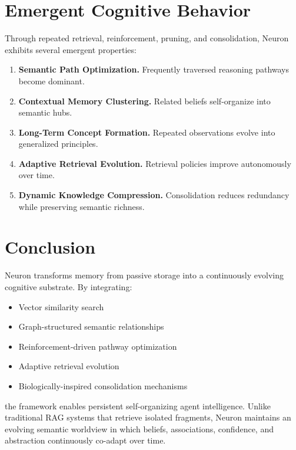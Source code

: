 \documentclass[11pt,a4paper]{article}
\begin{document}
\section{Emergent Cognitive Behavior}

Through repeated retrieval, reinforcement, pruning, and consolidation, Neuron exhibits
several emergent properties:

\begin{enumerate}
    \item \textbf{Semantic Path Optimization.}
          Frequently traversed reasoning pathways become dominant.

    \item \textbf{Contextual Memory Clustering.}
          Related beliefs self-organize into semantic hubs.

    \item \textbf{Long-Term Concept Formation.}
          Repeated observations evolve into generalized principles.

    \item \textbf{Adaptive Retrieval Evolution.}
          Retrieval policies improve autonomously over time.

    \item \textbf{Dynamic Knowledge Compression.}
          Consolidation reduces redundancy while preserving semantic richness.
\end{enumerate}

\section{Conclusion}

Neuron transforms memory from passive storage into a continuously evolving cognitive
substrate. By integrating:

\begin{itemize}
    \item Vector similarity search
    \item Graph-structured semantic relationships
    \item Reinforcement-driven pathway optimization
    \item Adaptive retrieval evolution
    \item Biologically-inspired consolidation mechanisms
\end{itemize}

the framework enables persistent self-organizing agent intelligence. Unlike traditional
RAG systems that retrieve isolated fragments, Neuron maintains an evolving semantic
worldview in which beliefs, associations, confidence, and abstraction continuously
co-adapt over time.
\end{document}
